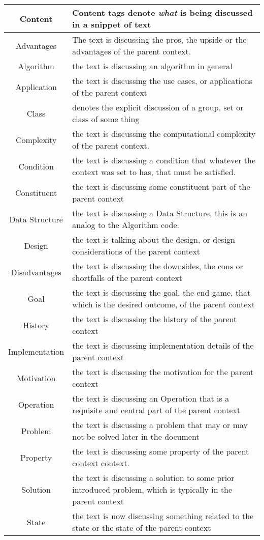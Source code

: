 \begin{table}[h!]
\begin{tabular}{c p{1.8\linewidth}}
    
    \textbf{Content} & Content tags denote \emph{what} is being discussed in a snippet of text \\
    \hline
    Advantages & The text is discussing the pros, the upside or the advantages of the parent context. \\
    Algorithm & the text is discussing an algorithm in general\\
    Application &  the text is discussing the use cases, or applications of the parent context\\
    Class & denotes the explicit discussion of a group, set or class of some thing\\
    Complexity & the text is discussing the computational complexity of the parent context.\\
    Condition & the text is discussing a condition that whatever the context was set to has, that must be satisfied.\\
    Constituent & the text is discussing some constituent part of the parent context\\
    Data Structure & the text is discussing a Data Structure, this is an analog to the Algorithm code.\\
    Design & the text is talking about the design, or design considerations of the parent context\\
    Disadvantages & the text is discussing the downsides, the cons or shortfalls of the parent context\\
    Goal & the text is discussing the goal, the end game, that which is the desired outcome, of the parent context\\
    History & the text is discussing the history of the parent context\\
    Implementation & the text is discussing implementation details of the parent context\\
    Motivation & the text is discussing the motivation for the parent context\\
    Operation & the text is discussing an Operation that is a requisite and central part of the parent context\\
    Problem & the text is discussing a problem that may or may not be solved later in the document\\
    Property & the text is discussing some property of the parent context context.\\
    Solution & the text is discussing a solution to some prior introduced problem, which is typically in the parent context\\
    State & the text is now discussing something related to the state or the state of the parent context\\


\end{tabular}
\end{table}
